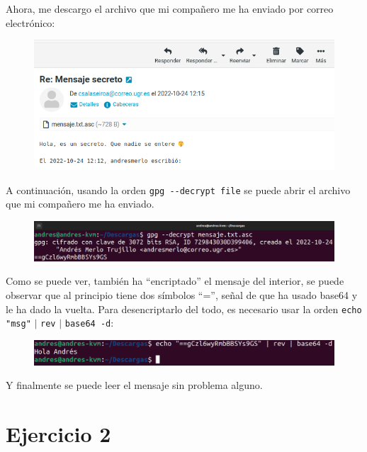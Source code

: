 \documentclass{article}
\begin{document}
Ahora, me descargo el archivo que mi compañero me ha enviado por correo electrónico:

\begin{figure}[H]
    \includegraphics[width=\textwidth]{imagenes/Portatil/Captura desde 2022-10-24 12-16-48.png}
\end{figure}

A continuación, usando la orden \verb|gpg --decrypt file| se puede abrir el archivo que mi compañero me ha enviado.

\begin{figure}[H]
    \includegraphics[width=\textwidth]{imagenes/Portatil/Captura desde 2022-10-24 12-18-40.png}
\end{figure}

Como se puede ver, también ha ``encriptado'' el mensaje del interior, se puede observar que al principio tiene dos símbolos ``='', señal de que ha usado base64 y le ha dado la vuelta. Para desencriptarlo del todo, es necesario usar la orden \verb|echo "msg"| $\vert$ \verb|rev| $\vert$ \verb|base64 -d|:

\begin{figure}[H]
    \includegraphics[width=\textwidth]{imagenes/Portatil/base64.png}
\end{figure}

Y finalmente se puede leer el mensaje sin problema alguno.

\newpage

\section*{Ejercicio 2}
\end{document}
